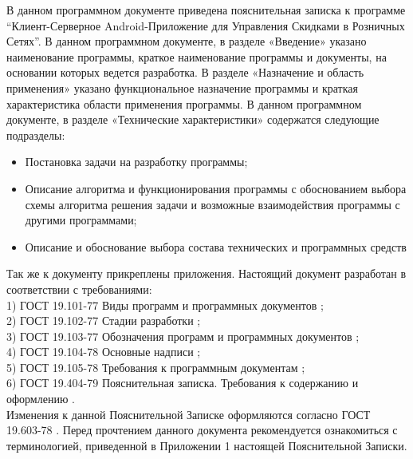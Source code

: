 В данном программном документе приведена пояснительная записка к программе 
``Клиент-Серверное Android-Приложение для Управления Скидками в Розничных Сетях''.
В данном программном документе, в разделе «Введение» указано наименование
программы, краткое наименование программы и документы, на основании которых
ведется разработка.
В разделе «Назначение и область применения» указано функциональное назначение
программы и краткая характеристика области применения программы.
В данном программном документе, в разделе «Технические характеристики»
содержатся следующие подразделы:
\begin{itemize}
    \item Постановка задачи на разработку программы;
    \item Описание алгоритма и функционирования программы с обоснованием выбора 
    схемы алгоритма решения задачи и возможные взаимодействия программы с 
    другими программами;
    \item Описание и обоснование выбора состава технических и программных 
    средств
\end{itemize}
Так же к документу прикреплены приложения. 
Настоящий документ разработан в соответствии с требованиями:\\
1) ГОСТ 19.101-77 Виды программ и программных документов \cite{gost_types_of_software};\\
2) ГОСТ 19.102-77 Стадии разработки \cite{gost_stages_of_devel};\\
3) ГОСТ 19.103-77 Обозначения программ и программных документов \cite{gost_marking_software};\\
4) ГОСТ 19.104-78 Основные надписи \cite{gost_main_signs};\\
5) ГОСТ 19.105-78 Требования к программным документам \cite{gost_demands_for_docs};\\
6) ГОСТ 19.404-79 Пояснительная записка. Требования к содержанию и оформлению  \cite{gost_pz}.\\


Изменения к данной Пояснительной Записке оформляются согласно ГОСТ 19.603-78 \cite{gost_main_rules_change}.
Перед прочтением данного документа рекомендуется ознакомиться с терминологией,
приведенной в Приложении 1 настоящей Пояснительной Записки.
